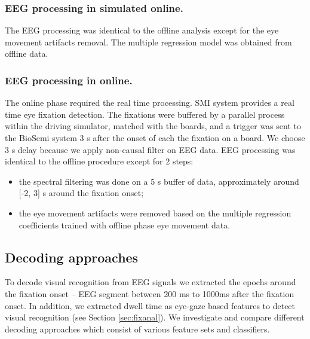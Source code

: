 \documentclass[12pt]{iopart}
\begin{document}
\subsubsection*{EEG processing in simulated online.}
The EEG processing was identical to the offline analysis
except for the eye movement artifacts removal. The multiple regression
model was obtained from offline data.

\subsubsection*{EEG processing in online.}
The online phase required the real time processing. SMI system provides
a real time eye fixation detection. The fixations were buffered
by a parallel process within the driving simulator, matched with the boards,
and a trigger was sent to the BioSemi system 3 s after the onset of each the fixation
on a board. We choose 3 s delay because we apply non-causal filter on EEG data.
EEG processing  was identical to the offline procedure
except for 2 steps:
\begin{itemize}
    \item the spectral filtering was done on a 5 s buffer of data,
        approximately around [-2, 3] s around the fixation onset;
    \item the eye movement artifacts were removed based on the multiple
        regression coefficients trained with offline phase eye movement data.
\end{itemize}

\subsection{Decoding approaches}
To decode visual recognition from EEG signals we extracted the epochs
around the fixation onset -- EEG segment between
200 ms to 1000ms  after the fixation onset.
In addition, we extracted dwell time as eye-gaze based features to detect
visual recognition (see Section \ref{sec:fixanal}).
We investigate and compare different decoding approaches which consist of 
various feature sets and classifiers.
\end{document}
